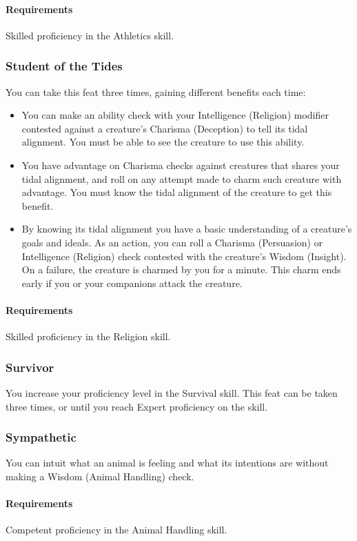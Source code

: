     \paragraph{Requirements} Skilled proficiency in the Athletics skill.
\subsubsection{Student of the Tides} \label{feat::studentofthetides}
    You can take this feat three times, gaining different benefits each time:
    \begin{itemize}
        \item You can make an ability check with your Intelligence (Religion) modifier contested against a creature's Charisma (Deception) to tell its tidal alignment.
        You must be able to see the creature to use this ability.
        \item You have advantage on Charisma checks against creatures that shares your tidal alignment, and roll on any attempt made to charm such creature with advantage.
        You must know the tidal alignment of the creature to get this benefit.
        \item By knowing its tidal alignment you have a basic understanding of a creature's goals and ideals.
        As an action, you can roll a Charisma (Persuasion) or Intelligence (Religion) check contested with the creature's Wisdom (Insight).
        On a failure, the creature is charmed by you for a minute.
        This charm ends early if you or your companions attack the creature.
    \end{itemize}
    \paragraph{Requirements} Skilled proficiency in the Religion skill.
\subsubsection{Survivor} \label{feat::survivor}
    You increase your proficiency level in the Survival skill.
    This feat can be taken three times, or until you reach Expert proficiency on the skill.
\subsubsection{Sympathetic} \label{feat::sympathetic}
    You can intuit what an animal is feeling and what its intentions are without making a Wisdom (Animal Handling) check.
    \paragraph{Requirements} Competent proficiency in the Animal Handling skill.

